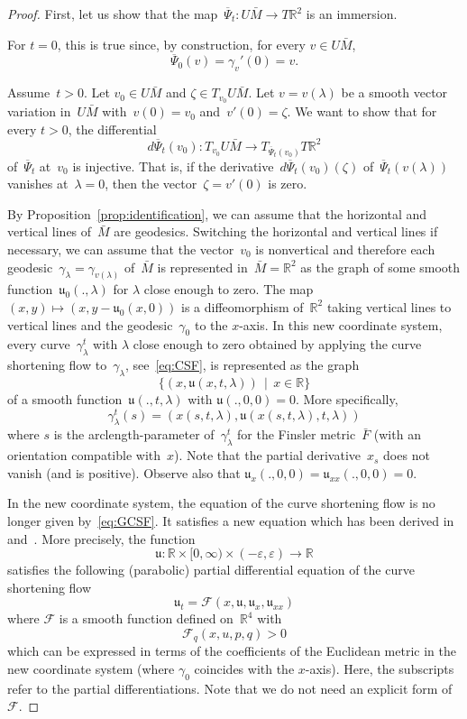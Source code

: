 \documentclass[AHL,Unicode,longabstracts,published]{cedram}
\newcommand{\FF}{\mathcal{F}}
\newcommand{\R}{\mathbb{R}}
\newcommand{\bu}{\mathfrak{u}}
\begin{document}
\begin{proof}
First, let us show that the map~$\overline{\Psi}_{t}:U\bar{M}\to T\R^{2}$ is an immersion.

For $t=0$, this is true since, by construction, for every $v \in U\bar{M}$,
\[
\overline{\Psi}_0(v) = \gamma_v'(0) = v.
\]

Assume~$t>0$. Let $v_0 \in U\bar{M}$ and $\zeta \in T_{v_0}U\bar{M}$. Let $v=v(\lambda)$ be a smooth vector variation in~$U\bar{M}$ with~$v(0)=v_0$ and~$v'(0)=\zeta$. We want to show that for every $t>0$, the differential
\[
d\overline{\Psi}_t(v_0): T_{v_0} U \bar{M} \to T_{\overline{\Psi}_t(v_0)} T \R^2
\]
of~$\overline{\Psi}_t$ at~$v_0$ is injective. That is, if the derivative~$d\overline{\Psi}_t(v_0)(\zeta)$ of~$\overline{\Psi}_t(v(\lambda))$ vanishes at~$\lambda=0$, then the vector~$\zeta=v'(0)$ is zero.

By Proposition~\ref{prop:identification}, we can assume that the horizontal and vertical lines of~$\bar{M}$ are geodesics. Switching the horizontal and vertical lines if necessary, we can assume that the vector~$v_0$ is nonvertical and therefore each geodesic~$\gamma_\lambda = \gamma_{v(\lambda)}$ of~$\bar{M}$ is represented in~$\bar{M}=\R^2$ as the graph of some smooth function~$\bu_0(.,\lambda)$ for $\lambda$ close enough to zero. The map $(x,y) \mapsto (x,y-\bu_0(x,0))$ is a diffeomorphism of~$\R^2$ taking vertical lines to vertical lines and the geodesic~$\gamma_0$ to the $x$-axis. In this new coordinate system, every curve~$\gamma_{\lambda}^t$ with $\lambda$ close enough to zero obtained by applying the curve shortening flow to~$\gamma_\lambda$, see~\eqref{eq:CSF}, is represented as the graph
\[
\{ (x,\bu(x,t,\lambda)) \, \mid \, x \in \R \}
\]
of a smooth function~$\bu(.,t,\lambda)$ with $\bu(.,0,0)=0$. More specifically,
\[
\gamma_\lambda^t(s) = (x(s,t,\lambda),\bu(x(s,t,\lambda),t,\lambda))
\]
where $s$ is the arclength-parameter of~$\gamma_\lambda^t$ for the Finsler metric~$\bar{F}$ (with an orientation compatible with~$x$). Note that the partial derivative~$x_s$ does not vanish (and is positive). Observe also that $\bu_x(.,0,0)=\bu_{xx}(.,0,0)=0$.

In the new coordinate system, the equation of the curve shortening flow is no longer given by~\eqref{eq:GCSF}. It satisfies a new equation which has been derived in~\cite[Eq.~(3.2)]{An90} and~\cite[Appendix]{gage90}. More precisely, the function
\[
\bu : \R \times [0,\infty) \times (-\varepsilon,\varepsilon) \to \R
\]
satisfies the following (parabolic) partial differential equation of the curve shortening flow
\begin{equation}\label{eq:utF}
\bu_t = \FF\left(x,\bu, \bu_x, \bu_{xx}\right)
\end{equation}
where $\FF$ is a smooth function defined on~$\R^4$ with
\[
\FF_q(x,u,p,q) >0
\]
which can be expressed in terms of the coefficients of the Euclidean metric in the new coordinate system (where $\gamma_0$ coincides with the $x$-axis). Here, the subscripts refer to the partial differentiations. Note that we do not need an explicit form of $\FF$.


\end{proof}
\end{document}
